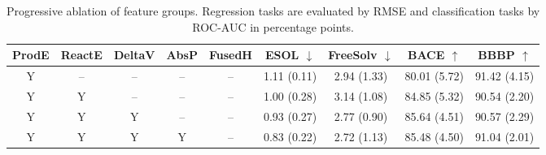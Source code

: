 \begin{table}[t]
\centering
{\small
\setlength{\tabcolsep}{4pt}
\begin{tabular}{ccccc*{4}{c}}
\hline
ProdE & ReactE & DeltaV & AbsP & FusedH & ESOL $\downarrow$ & FreeSolv $\downarrow$ & BACE $\uparrow$ & BBBP $\uparrow$ \\
\hline
Y & -- & -- & -- & -- & 1.11 (0.11) & 2.94 (1.33) & 80.01 (5.72) & 91.42 (4.15) \\
Y & Y & -- & -- & -- & 1.00 (0.28) & 3.14 (1.08) & 84.85 (5.32) & 90.54 (2.20) \\
Y & Y & Y & -- & -- & 0.93 (0.27) & 2.77 (0.90) & 85.64 (4.51) & 90.57 (2.29) \\
Y & Y & Y & Y & -- & 0.83 (0.22) & 2.72 (1.13) & 85.48 (4.50) & 91.04 (2.01) \\
\hline
\end{tabular}
}
\caption{Progressive ablation of feature groups. Regression tasks are evaluated by RMSE and classification tasks by ROC-AUC in percentage points.}
\label{tab:ablation_progressive}
\end{table}
